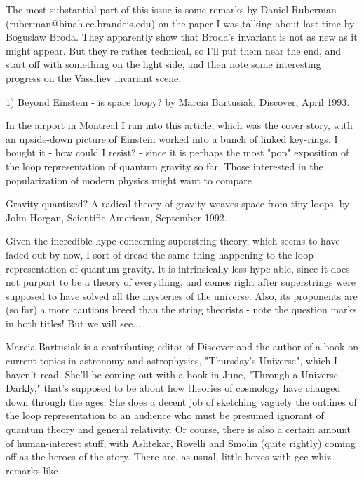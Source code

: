 

The most substantial part of this issue is some remarks by
Daniel Ruberman (ruberman@binah.cc.brandeis.edu) on the paper I was
talking about last time by Boguslaw Broda.  They apparently show that
Broda's invariant is not as new as it might appear.  But they're rather
technical, so I'll put them near the end, and start off with something
on the light side, and then note some interesting progress on the
Vassiliev invariant scene.

1)  Beyond Einstein - is space loopy? by Marcia Bartusiak, Discover,
April 1993.

In the airport in Montreal I ran into this article, which was the cover
story, with an upside-down picture of Einstein worked into a bunch of
linked key-rings.  I bought it - how could I resist? - since it is 
perhaps the most "pop" exposition of the loop representation of quantum
gravity so far.  Those interested in the popularization of modern
physics might want to compare 

Gravity quantized? A radical theory of gravity weaves space from tiny
loops, by John Horgan, Scientific American, September 1992.

Given the incredible hype concerning superstring theory, which seems to
have faded out by now, I sort of dread the same thing happening to the
loop representation of quantum gravity.  It is intrinsically less
hype-able, since it does not purport to be a theory of everything, and
comes right after superstrings were supposed to have solved all the
mysteries of the universe.  Also, its proponents are (so far) a more
cautious breed than the string theorists - note the question marks in
both titles!   But we will see....

Marcia Bartusiak is a contributing editor of Discover and the author of
a book on current topics in astronomy and astrophysics, "Thursday's
Universe", which I haven't read.  She'll be coming out with a book in
June, "Through a Universe Darkly," that's supposed to be about how
theories of cosmology have changed down through the ages.  She does a
decent job of sketching vaguely the outlines of the loop representation
to an audience who must be presumed ignorant of quantum theory and
general relativity.  Or course, there is also a certain amount of
human-interest stuff, with Ashtekar, Rovelli and Smolin (quite rightly)
coming off as the heroes of the story.  There are, as usual, little
boxes with gee-whiz remarks like 


